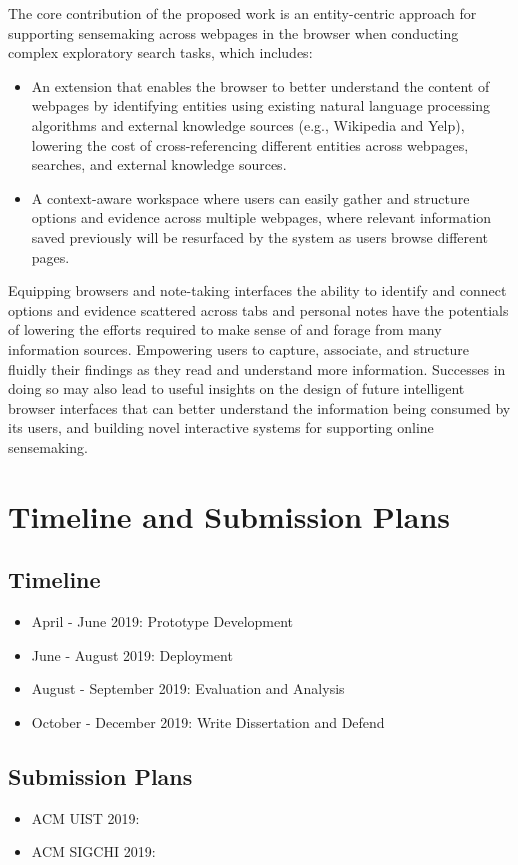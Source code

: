 The core contribution of the proposed work is an entity-centric approach for supporting sensemaking across webpages in the browser when conducting complex exploratory search tasks, which includes:

\begin{itemize}
\item An extension that enables the browser to better understand the content of webpages by identifying entities using existing natural language processing algorithms and external knowledge sources (e.g., Wikipedia and Yelp), lowering the cost of cross-referencing different entities across webpages, searches, and external knowledge sources. 
\item A context-aware workspace where users can easily gather and structure options and evidence across multiple webpages, where relevant information saved previously will be resurfaced by the system as users browse different pages.
\end{itemize}

Equipping browsers and note-taking interfaces the ability to identify and connect options and evidence scattered across tabs and personal notes have the potentials of lowering the efforts required to make sense of and forage from many information sources. Empowering users to capture, associate, and structure fluidly their findings as they read and understand more information. Successes in doing so may also lead to useful insights on the design of future intelligent browser interfaces that can better understand the information being consumed by its users, and building novel interactive systems for supporting online sensemaking.


\section{Timeline and Submission Plans}

\subsection*{Timeline}

\begin{itemize}
    \item April - June 2019: Prototype Development
    \item June - August 2019: Deployment
    \item August - September 2019: Evaluation and Analysis
    \item October - December 2019: Write Dissertation and Defend 
\end{itemize}

\subsection*{Submission Plans}

\begin{itemize}
    \item ACM UIST 2019: 
    \item ACM SIGCHI 2019: 
\end{itemize}